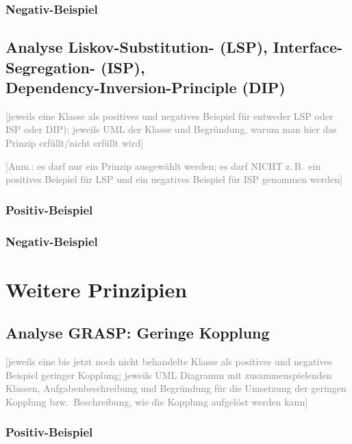 \documentclass[a4paper,12pt]{article}
\newcommand{\placeholder}[1]{\textcolor{gray}{[#1]}}
\begin{document}
\subsubsection*{Negativ-Beispiel}

\bigskip

\subsection*{Analyse Liskov-Substitution- (LSP), Interface-Segregation- (ISP),\\
    Dependency-Inversion-Principle (DIP)}

\placeholder{jeweils eine Klasse als positives und negatives Beispiel für entweder LSP oder ISP oder DIP);
    jeweils UML der Klasse und Begründung, warum man hier das Prinzip erfüllt/nicht erfüllt wird}

\smallskip
\noindent\placeholder{Anm.: es darf nur ein Prinzip ausgewählt werden; es darf NICHT z.\,B.\ ein positives
    Beispiel für LSP und ein negatives Beispiel für ISP genommen werden}

\subsubsection*{Positiv-Beispiel}

\subsubsection*{Negativ-Beispiel}

\section{Weitere Prinzipien}

\subsection*{Analyse GRASP: Geringe Kopplung}

\placeholder{jeweils eine bis jetzt noch nicht behandelte Klasse als positives und negatives Beispiel
    geringer Kopplung; jeweils UML Diagramm mit zusammenspielenden Klassen, Aufgabenbeschreibung und
    Begründung für die Umsetzung der geringen Kopplung bzw.\ Beschreibung, wie die Kopplung aufgelöst
    werden kann}

\subsubsection*{Positiv-Beispiel}
\end{document}
